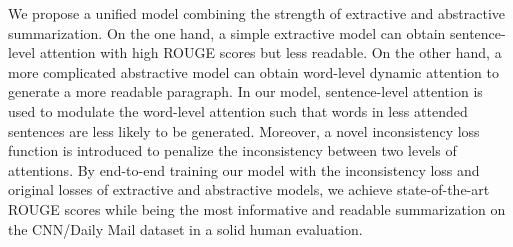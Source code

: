 We propose a unified model combining the strength of extractive and abstractive summarization. On the one hand, a simple extractive model can obtain sentence-level attention with high ROUGE scores but less readable. On the other hand, a more complicated abstractive model can obtain word-level dynamic attention to generate a more readable paragraph. In our model, sentence-level attention is used to modulate the word-level attention such that words in less attended sentences are less likely to be generated. Moreover, a novel inconsistency loss function is introduced to penalize the inconsistency between two levels of attentions. By end-to-end training our model with the inconsistency loss and original losses of extractive and abstractive models, we achieve state-of-the-art ROUGE scores while being the most informative and readable summarization on the CNN/Daily Mail dataset in a solid human evaluation.

